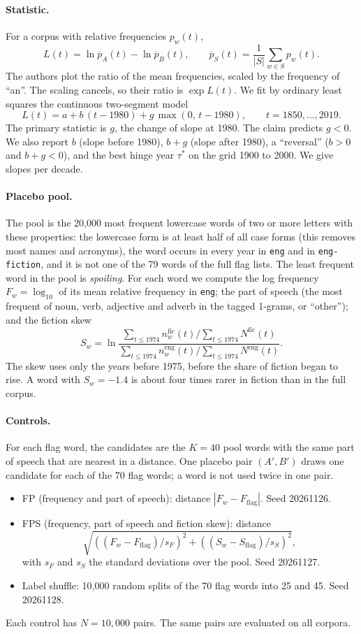 \documentclass[11pt]{article}
\begin{document}
\paragraph{Statistic.} For a corpus with relative frequencies $p_w(t)$,
\[
L(t) = \ln \overline{p}_A(t) - \ln \overline{p}_B(t), \qquad \overline{p}_S(t) = \frac{1}{|S|}\sum_{w\in S} p_w(t).
\]
The authors plot the ratio of the mean frequencies, scaled by the frequency of ``an''. The scaling cancels, so their ratio is $\exp L(t)$. We fit by ordinary least squares the continuous two-segment model
\[
L(t) = a + b\,(t-1980) + g\,\max(0,\, t-1980), \qquad t = 1850,\dots,2019.
\]
The primary statistic is $g$, the change of slope at 1980. The claim predicts $g<0$. We also report $b$ (slope before 1980), $b+g$ (slope after 1980), a ``reversal'' ($b>0$ and $b+g<0$), and the best hinge year $\tau^*$ on the grid 1900 to 2000. We give slopes per decade.

\paragraph{Placebo pool.} The pool is the 20,000 most frequent lowercase words of two or more letters with these properties: the lowercase form is at least half of all case forms (this removes most names and acronyms), the word occurs in every year in \texttt{eng} and in \texttt{eng-fiction}, and it is not one of the 79 words of the full flag lists. The least frequent word in the pool is \emph{spoiling}. For each word we compute the log frequency $F_w = \log_{10}$ of its mean relative frequency in \texttt{eng}; the part of speech (the most frequent of noun, verb, adjective and adverb in the tagged 1-grams, or ``other''); and the fiction skew
\[
S_w = \ln \frac{\sum_{t\le 1974} n^{\mathrm{fic}}_w(t) / \sum_{t\le 1974} N^{\mathrm{fic}}(t)}{\sum_{t\le 1974} n^{\mathrm{eng}}_w(t) / \sum_{t\le 1974} N^{\mathrm{eng}}(t)}.
\]
The skew uses only the years before 1975, before the share of fiction began to rise. A word with $S_w = -1.4$ is about four times rarer in fiction than in the full corpus.

\paragraph{Controls.} For each flag word, the candidates are the $K = 40$ pool words with the same part of speech that are nearest in a distance. One placebo pair $(A',B')$ draws one candidate for each of the 70 flag words; a word is not used twice in one pair.
\begin{itemize}
\item FP (frequency and part of speech): distance $|F_w - F_{\mathrm{flag}}|$. Seed 20261126.
\item FPS (frequency, part of speech and fiction skew): distance
\[\sqrt{((F_w-F_{\mathrm{flag}})/s_F)^2 + ((S_w-S_{\mathrm{flag}})/s_S)^2},\]
with $s_F$ and $s_S$ the standard deviations over the pool. Seed 20261127.
\item Label shuffle: 10,000 random splits of the 70 flag words into 25 and 45. Seed 20261128.
\end{itemize}
Each control has $N = 10{,}000$ pairs. The same pairs are evaluated on all corpora.
\end{document}
